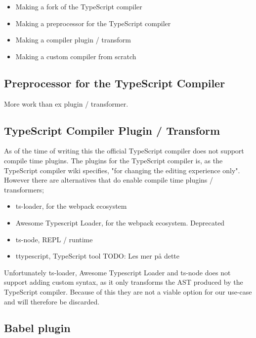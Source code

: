 \begin{itemize}
    \item Making a fork of the TypeScript compiler
    \item Making a preprocessor for the TypeScript compiler
    \item Making a compiler plugin / transform
    \item Making a custom compiler from scratch
\end{itemize}


\subsection{Preprocessor for the TypeScript Compiler}\label{subsec:preprocessor-for-the-typescript-compiler}

More work than ex plugin / transformer.

\subsection{TypeScript Compiler Plugin / Transform}\label{subsec:typescript-compiler-plugin}

As of the time of writing this the official TypeScript compiler does not support compile time plugins. The plugins for the TypeScript compiler is, as the TypeScript compiler wiki specifies, "for changing the editing experience only"\cite{tscplugin}.
However there are alternatives that do enable compile time plugins / transformers;

\begin{itemize}
    \item ts-loader\cite{tsloadergithub}, for the webpack ecosystem
    \item Awesome Typescript Loader\cite{awesometypescriptloadergithub}, for the webpack ecosystem. Deprecated
    \item ts-node\cite{tsnodegithub}, REPL / runtime
    \item ttypescript\cite{ttypescriptgithub}, TypeScript tool TODO: Les mer på dette
\end{itemize}

Unfortunately ts-loader, Awesome Typescript Loader and ts-node does not support adding custom syntax, as it only transforms the AST produced by the TypeScript compiler.
Because of this they are not a viable option for our use-case and will therefore be discarded.

\subsection{Babel plugin}\label{subsec:babel-plugin}

